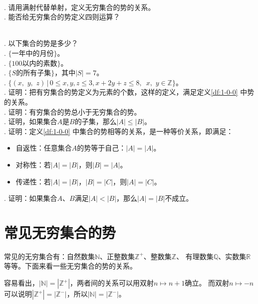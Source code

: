 \documentclass[12pt,UTF8]{ctexbook}
\begin{document}
\begin{sk}
    \mbox{} \\
    . 请用满射代替单射，定义无穷集合的势的关系。\\
    . 能否给无穷集合的势定义四则运算？
\end{sk}

\begin{xt}
    \mbox{} \\
    . 以下集合的势是多少？\\
    . $\{\mbox{一年中的月份}\}$。\\ 
    . $\{100\mbox{以内的素数}\}$。\\ 
    . $\{S\mbox{的所有子集}\}$，其中$|S| = 7$。\\ 
    . $\{(x, \,\, y, \,\, z) \, | \, 0 \leqslant x, y, z \leqslant 3, x + 2y + z \leqslant 8,\,\,\, x,\,\, y \in  \mathbb{Z}\}$。\\ 
    . 证明：把有穷集合的势定义为元素的个数，这样的定义，满足定义\ref{df:1-0-0} 中势的关系。\\
    . 证明：有穷集合的势总小于无穷集合的势。\\
    . 证明，如果集合$A$是$B$的子集，那么$|A| \leqslant |B|$。\\
    . 证明：定义\ref{df:1-0-0} 中集合的势相等的关系，是一种等价关系，即满足：
    \indent \begin{itemize}
        \item 自返性：任意集合$A$的势等于自己：$|A| = |A|$。
        \item 对称性：若$|A| = |B|$，则$|B| = |A|$。
        \item 传递性：若$|A| = |B|$，$|B| = |C|$，则$|A| = |C|$。
    \end{itemize}

    . 证明：如果集合$A$、$B$满足$|A| < |B|$，那么$|A| = |B|$不成立。

\end{xt}

\section{常见无穷集合的势}

常见的无穷集合有：自然数集$\mathbb{N}$、正整数集$\mathbb{Z}^+$、整数集$\mathbb{Z}$、
有理数集$\mathbb{Q}$、实数集$\mathbb{R}$等等。下面来看一些无穷集合的势的关系。

容易看出，$|\mathbb{N}| = |\mathbb{Z}^+|$，两者间的关系可以用双射$n\mapsto n + 1$确立。
而双射$n \mapsto -n$可以说明$|\mathbb{Z}^+| = |\mathbb{Z}^-|$，所以$|\mathbb{N}| = |\mathbb{Z}^-|$。
\end{document}
